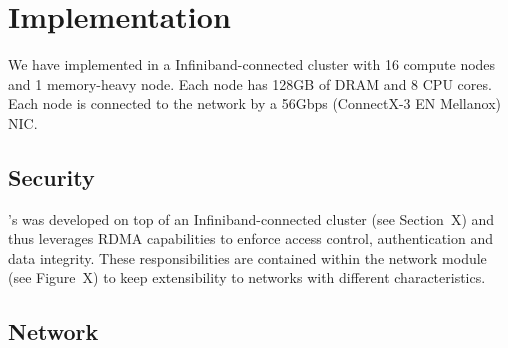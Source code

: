 \section{Implementation}
\label{sec:implementation}

We have implemented \System in a Infiniband-connected cluster with 16 compute nodes and 1 memory-heavy node. Each node has 128GB of DRAM and 8 CPU cores. Each node is connected to the network by a 56Gbps (ConnectX-3 EN Mellanox) NIC.

\subsection{\System}


\subsection{Security}


\System's was developed on top of an Infiniband-connected cluster (see Section~X) and thus leverages RDMA capabilities to enforce access control, authentication and data integrity. These responsibilities are contained within the network module (see Figure~X) to keep extensibility to networks with different characteristics.


\subsection{Network}

